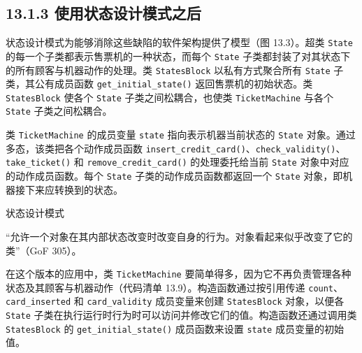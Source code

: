 \subsection{13.1.3 使用状态设计模式之后}

状态设计模式为能够消除这些缺陷的软件架构提供了模型（图 13.3）。超类 \texttt{State} 的每一个子类都表示售票机的一种状态，而每个 \texttt{State} 子类都封装了对其状态下的所有顾客与机器动作的处理。类 \texttt{States\allowbreak{}Block} 以私有方式聚合所有 \texttt{State} 子类，其公有成员函数 \texttt{get\_\allowbreak{}initial\_\allowbreak{}state(\allowbreak{})\allowbreak{}} 返回售票机的初始状态。类 \texttt{States\allowbreak{}Block} 使各个 \texttt{State} 子类之间松耦合，也使类 \texttt{Ticket\allowbreak{}Machine} 与各个 \texttt{State} 子类之间松耦合。

类 \texttt{Ticket\allowbreak{}Machine} 的成员变量 \texttt{state} 指向表示机器当前状态的 \texttt{State} 对象。通过多态，该类把各个动作成员函数 \texttt{insert\_\allowbreak{}credit\_\allowbreak{}card(\allowbreak{})\allowbreak{}}、\texttt{check\_\allowbreak{}validity(\allowbreak{})\allowbreak{}}、\texttt{take\_\allowbreak{}ticket(\allowbreak{})\allowbreak{}} 和 \texttt{remove\_\allowbreak{}credit\_\allowbreak{}card(\allowbreak{})\allowbreak{}} 的处理委托给当前 \texttt{State} 对象中对应的动作成员函数。每个 \texttt{State} 子类的动作成员函数都返回一个 \texttt{State} 对象，即机器接下来应转换到的状态。

\begin{mySidebar}{状态设计模式}

“允许一个对象在其内部状态改变时改变自身的行为。对象看起来似乎改变了它的类”（GoF 305）。
\end{mySidebar}


在这个版本的应用中，类 \texttt{Ticket\allowbreak{}Machine} 要简单得多，因为它不再负责管理各种状态及其顾客与机器动作（代码清单 13.9）。构造函数通过按引用传递 \texttt{count}、\texttt{card\_\allowbreak{}inserted} 和 \texttt{card\_\allowbreak{}validity} 成员变量来创建 \texttt{States\allowbreak{}Block} 对象，以便各 \texttt{State} 子类在执行运行时行为时可以访问并修改它们的值。构造函数还通过调用类 \texttt{States\allowbreak{}Block} 的 \texttt{get\_\allowbreak{}initial\_\allowbreak{}state(\allowbreak{})\allowbreak{}} 成员函数来设置 \texttt{state} 成员变量的初始值。

